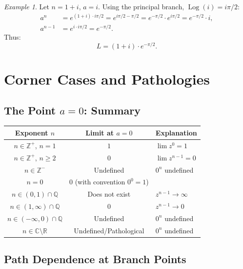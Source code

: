 \documentclass{article}
\theoremstyle{definition}
\theoremstyle{remark}
\newtheorem{example}{Example}[section]
\newcommand{\C}{\mathbb{C}}
\newcommand{\R}{\mathbb{R}}
\newcommand{\Z}{\mathbb{Z}}
\newcommand{\Q}{\mathbb{Q}}
\newcommand{\Log}{\operatorname{Log}}
\begin{document}
\begin{example}
Let $n = 1 + i$, $a = i$. Using the principal branch, $\Log(i) = i\pi/2$:
\begin{align}
a^n &= e^{(1+i) \cdot i\pi/2} = e^{i\pi/2 - \pi/2} = e^{-\pi/2} \cdot e^{i\pi/2} = e^{-\pi/2} \cdot i, \\
a^{n-1} &= e^{i \cdot i\pi/2} = e^{-\pi/2}.
\end{align}
Thus:
\begin{equation}
L = (1+i) \cdot e^{-\pi/2}.
\end{equation}
\end{example}

\section{Corner Cases and Pathologies}

\subsection{The Point $a = 0$: Summary}

\begin{center}
\renewcommand{\arraystretch}{1.4}
\begin{tabular}{|c|c|l|}
\hline
\textbf{Exponent $n$} & \textbf{Limit at $a = 0$} & \textbf{Explanation} \\
\hline
$n \in \Z^+$, $n = 1$ & $1$ & $\lim z^0 = 1$ \\
$n \in \Z^+$, $n \geq 2$ & $0$ & $\lim z^{n-1} = 0$ \\
$n \in \Z^-$ & Undefined & $0^n$ undefined \\
$n = 0$ & $0$ (with convention $0^0 = 1$) & \\
$n \in (0,1) \cap \Q$ & Does not exist & $z^{n-1} \to \infty$ \\
$n \in (1,\infty) \cap \Q$ & $0$ & $z^{n-1} \to 0$ \\
$n \in (-\infty, 0) \cap \Q$ & Undefined & $0^n$ undefined \\
$n \in \C \setminus \R$ & Undefined/Pathological & $0^n$ undefined \\
\hline
\end{tabular}
\end{center}

\subsection{Path Dependence at Branch Points}
\end{document}
